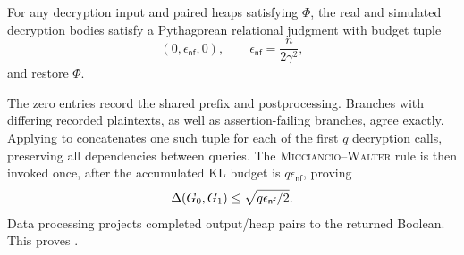 \begin{lemma}
\label{lem:one-call}
For any decryption input and paired heaps satisfying \(\Phi\), the real and
simulated decryption bodies satisfy a Pythagorean relational judgment with
budget tuple
\[
 (0,\epsilon_{\mathsf{nf}},0),
 \qquad
 \epsilon_{\mathsf{nf}}=\frac{n}{2\gamma^2},
\]
and restore \(\Phi\).
\end{lemma}

The zero entries record the shared prefix and postprocessing.
Branches with differing recorded plaintexts, as well as assertion-failing
branches, agree exactly.
Applying  to  concatenates one
such tuple for each of the first \(q\) decryption calls, preserving all
dependencies between queries.
The \textsc{Micciancio--Walter} rule is then invoked once, after the accumulated
KL budget is \(q\epsilon_{\mathsf{nf}}\), proving
\[
 \Delta(G_0,G_1)\leq\sqrt{q\epsilon_{\mathsf{nf}}/2}.
\]
Data processing projects completed output/heap pairs to the returned Boolean.
This proves .


